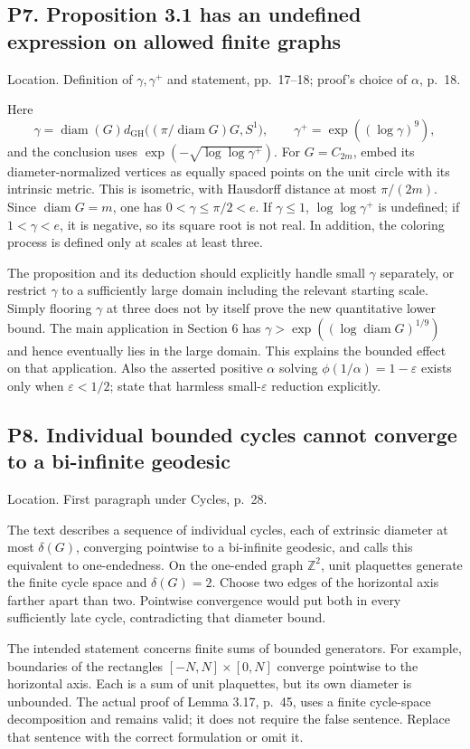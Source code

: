 \documentclass[10pt]{article}
\begin{document}
\subsection*{P7. Proposition 3.1 has an undefined expression on allowed finite graphs}
Location. Definition of \(\gamma,\gamma^+\) and statement, pp. 17–18; proof’s choice of \(\alpha\), p. 18.\par
Here \[\gamma=\operatorname{diam}(G)d_{\mathrm{GH}}\bigl((\pi/\operatorname{diam}G)G,S^1\bigr),\qquad
 \gamma^+=\exp((\log\gamma)^9),\] and the conclusion uses \(\exp(-\sqrt{\log\log\gamma^+})\). For \(G=C_{2m}\), embed its diameter-normalized vertices as equally spaced points on the unit circle with its intrinsic metric. This is isometric, with Hausdorff distance at most \(\pi/(2m)\). Since \(\operatorname{diam}G=m\), one has \(0<\gamma\le\pi/2<e\). If \(\gamma\le1\), \(\log\log\gamma^+\) is undefined; if \(1<\gamma<e\), it is negative, so its square root is not real. In addition, the coloring process is defined only at scales at least three.\par
The proposition and its deduction should explicitly handle small \(\gamma\) separately, or restrict \(\gamma\) to a sufficiently large domain including the relevant starting scale. Simply flooring \(\gamma\) at three does not by itself prove the new quantitative lower bound. The main application in Section 6 has \(\gamma>\exp((\log\operatorname{diam}G)^{1/9})\) and hence eventually lies in the large domain. This explains the bounded effect on that application. Also the asserted positive \(\alpha\) solving \(\phi(1/\alpha)=1-\varepsilon\) exists only when \(\varepsilon<1/2\); state that harmless small-\(\varepsilon\) reduction explicitly.\par
\subsection*{P8. Individual bounded cycles cannot converge to a bi-infinite geodesic}
Location. First paragraph under Cycles, p. 28.\par
The text describes a sequence of individual cycles, each of extrinsic diameter at most \(\delta(G)\), converging pointwise to a bi-infinite geodesic, and calls this equivalent to one-endedness. On the one-ended graph \(\mathbb Z^2\), unit plaquettes generate the finite cycle space and \(\delta(G)=2\). Choose two edges of the horizontal axis farther apart than two. Pointwise convergence would put both in every sufficiently late cycle, contradicting that diameter bound.\par
The intended statement concerns finite sums of bounded generators. For example, boundaries of the rectangles \([-N,N]\times[0,N]\) converge pointwise to the horizontal axis. Each is a sum of unit plaquettes, but its own diameter is unbounded. The actual proof of Lemma 3.17, p. 45, uses a finite cycle-space decomposition and remains valid; it does not require the false sentence. Replace that sentence with the correct formulation or omit it.\par
\end{document}
